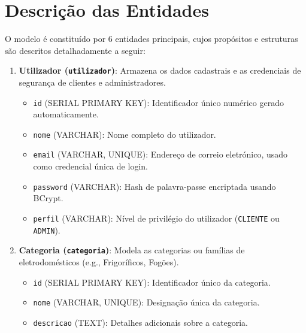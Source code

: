 \documentclass[11pt,a4paper,oneside]{report}
\begin{document}
\section{Descrição das Entidades}
O modelo é constituído por 6 entidades principais, cujos propósitos e estruturas são descritos detalhadamente a seguir:
\begin{enumerate}
    \item \textbf{Utilizador (\texttt{utilizador})}: Armazena os dados cadastrais e as credenciais de segurança de clientes e administradores.
    \begin{itemize}
        \item \texttt{id} (SERIAL PRIMARY KEY): Identificador único numérico gerado automaticamente.
        \item \texttt{nome} (VARCHAR): Nome completo do utilizador.
        \item \texttt{email} (VARCHAR, UNIQUE): Endereço de correio eletrónico, usado como credencial única de login.
        \item \texttt{password} (VARCHAR): Hash de palavra-passe encriptada usando BCrypt.
        \item \texttt{perfil} (VARCHAR): Nível de privilégio do utilizador (\texttt{CLIENTE} ou \texttt{ADMIN}).
    \end{itemize}

    \item \textbf{Categoria (\texttt{categoria})}: Modela as categorias ou famílias de eletrodomésticos (e.g., Frigoríficos, Fogões).
    \begin{itemize}
        \item \texttt{id} (SERIAL PRIMARY KEY): Identificador único da categoria.
        \item \texttt{nome} (VARCHAR, UNIQUE): Designação única da categoria.
        \item \texttt{descricao} (TEXT): Detalhes adicionais sobre a categoria.
    \end{itemize}


\end{enumerate}
\end{document}
